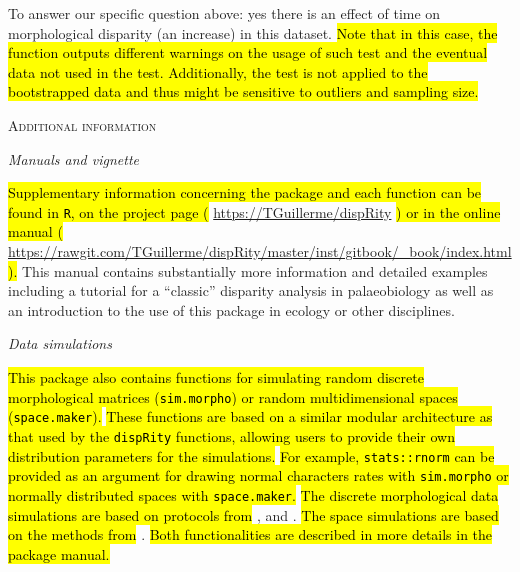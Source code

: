 \documentclass[12pt,letterpaper]{article}
\renewcommand{\section}[1]{%
\bigskip
\begin{center}
\begin{Large}
\normalfont\scshape #1
\medskip
\end{Large}
\end{center}}
\renewcommand{\subsection}[1]{%
\bigskip
\begin{center}
\begin{large}
\normalfont\itshape #1
\end{large}
\end{center}}
\newcommand{\disp}{\texttt{dispRity} }
\begin{document}
To answer our specific question above: yes there is an effect of time on morphological disparity (an increase) in this dataset.
\hl{Note that in this case, the function outputs different warnings on the usage of such test and the eventual data not used in the test.
Additionally, the test is not applied to the bootstrapped data and thus might be sensitive to outliers and sampling size.}

\section{Additional information}
\subsection{Manuals and vignette}
\hl{Supplementary information concerning the package and each function can be found in \texttt{R}, on the project page (}
\url{https://TGuillerme/dispRity}
\hl{) or in the online manual (}
\url{https://rawgit.com/TGuillerme/dispRity/master/inst/gitbook/_book/index.html}
\hl{).}
This manual contains substantially more information and detailed examples including a tutorial for a ``classic'' disparity analysis in palaeobiology as well as an introduction to the use of this package in ecology or other disciplines. 

\subsection{Data simulations}
\hl{This package also contains functions for simulating random discrete morphological matrices (\texttt{sim.morpho}) or random multidimensional spaces (\texttt{space.maker}).}
\hl{These functions are based on a similar modular architecture as that used by the \texttt{dispRity} functions, allowing users to provide their own distribution parameters for the simulations.}
\hl{For example, \texttt{stats::rnorm} can be provided as an argument for drawing normal characters rates with \texttt{sim.morpho} or normally distributed spaces with \texttt{space.maker}.}
\hl{The discrete morphological data simulations are based on protocols from }
\cite{GuillermeCooper}, \cite{OReilly20160081} and \cite{puttick2017uncertain}.
\hl{The space simulations are based on the methods from}
\cite{diaz2016global}.
\hl{Both functionalities are described in more details in the package manual.}

\end{document}
